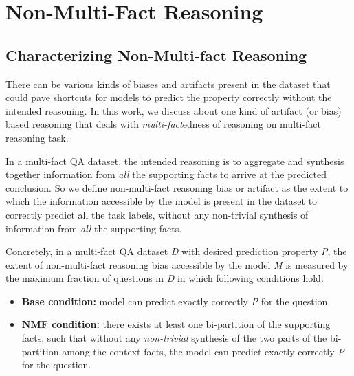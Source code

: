 \section{Non-Multi-Fact Reasoning}

\subsection{Characterizing Non-Multi-fact Reasoning}

There can be various kinds of biases and artifacts present in the dataset that could pave shortcuts for models to predict the property correctly without the intended reasoning. In this work, we discuss about one kind of artifact (or bias) based reasoning that deals with \textit{multi-fact}edness of reasoning on multi-fact reasoning task. 

In a multi-fact QA dataset, the intended reasoning is to aggregate and synthesis together information from \textit{all} the supporting facts to arrive at the predicted conclusion. So we define non-multi-fact reasoning bias or artifact as the extent to which the information accessible by the model is present in the dataset to correctly predict all the task labels, without any non-trivial synthesis of information from \textit{all} the supporting facts.

Concretely, in a multi-fact QA dataset {\it D} with desired prediction property {\it P}, the extent of non-multi-fact reasoning bias accessible by the model {\it M} is measured by the maximum fraction of questions in {\it D} in which following conditions hold:

\begin{itemize}
    \item \textbf{Base condition:} model can predict exactly correctly {\it P} for the question.
    \item \textbf{NMF condition:} there exists at least one bi-partition of the supporting facts, such that without any \textit{non-trivial} synthesis of the two parts of the bi-partition among the context facts, the model can predict exactly correctly {\it P} for the question.
\end{itemize}



